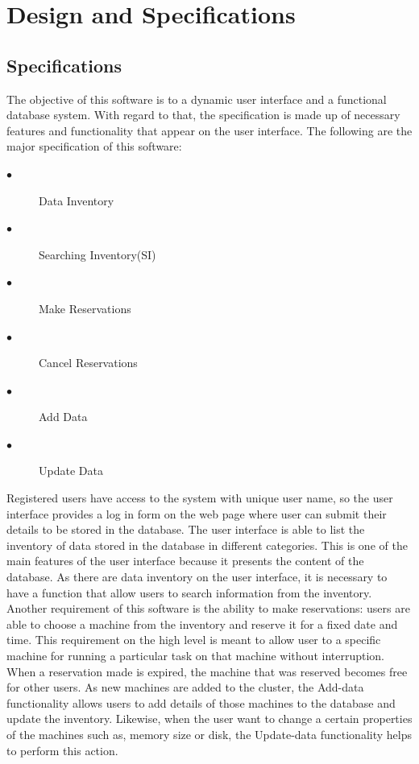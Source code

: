 \chapter{Design and Specifications}
\label{chap:figtab}
\label{chap}

\section{Specifications}

 The objective of this software is to  a dynamic user interface and a functional database system. With regard to that, the specification is made up of necessary features and functionality that appear on the user interface. The following are the major specification of this software:
\begin{description}
\item[$\bullet$] Data Inventory
\item[$\bullet$] Searching Inventory(SI)
\item[$\bullet$] Make Reservations
\item[$\bullet$] Cancel Reservations
\item[$\bullet$] Add Data
\item[$\bullet$] Update Data
\end{description}
Registered users have access to the system with unique user name, so the user interface provides a log in form on the web page where user can submit their details to be stored in the database. The user interface is able to list the inventory of data stored in the database in different categories. This is one of the main features of the user interface because it presents the content of the database. As there are data inventory on the user interface, it is necessary to have a function that allow users to search information from the inventory.  Another requirement of this software is the ability to make reservations: users are able to choose a machine from the inventory and reserve it for a fixed date and time. This requirement on the high level is meant to allow user to a specific machine for running a particular task on that machine without interruption. When a reservation made is expired, the machine that was reserved becomes free for other users. As new machines are added to the cluster, the Add-data functionality allows users to add details of those machines to the database and update the inventory. Likewise, when the user want to change a certain properties of the machines such as, memory size or disk, the Update-data functionality helps to perform this action.


